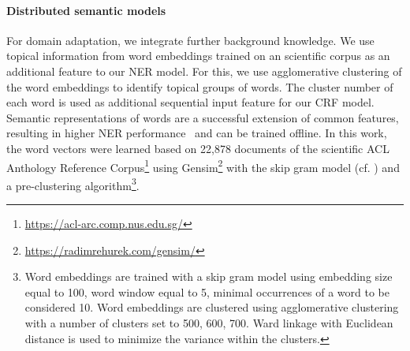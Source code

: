 \paragraph{Distributed semantic models}%
\label{subsec:dist-model}
For domain adaptation, we integrate further background knowledge.
We use topical information from word embeddings trained on an scientific corpus as an additional feature to our NER model.
For this, we use agglomerative clustering of the word embeddings to identify topical groups of words.
The cluster number of each word is used as additional sequential input feature for our CRF model.
Semantic representations of words are a successful extension of common features, resulting in higher NER performance~\cite{Turian} and can be trained offline.
In this work, the word vectors were learned based on 22,878 documents of the scientific ACL Anthology Reference Corpus\footnote{\url{https://acl-arc.comp.nus.edu.sg/}} using Gensim\footnote{\url{https://radimrehurek.com/gensim/}} with the skip gram model (cf. \cite{mikolov2013distributed}) 
and a pre-clustering algorithm\footnote{
Word embeddings are trained with a skip gram model using embedding size equal to 100, word window equal to 5, minimal occurrences of a word to be considered 10. Word embeddings are clustered using agglomerative clustering with a number of clusters set to {500, 600, 700}. Ward linkage with Euclidean distance is used to minimize the variance within the clusters.}.

